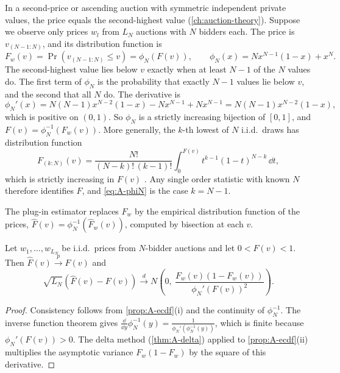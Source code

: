 In a second-price or ascending auction with symmetric independent private values, the price equals
the second-highest value (\cref{ch:auction-theory}). Suppose we observe only prices $w_l$ from $L_N$
auctions with $N$ bidders each. The price is $v_{(N-1:N)}$, and its distribution function is
\begin{equation}\label{eq:A-phiN}
F_w(v)=\Pr\left(v_{(N-1:N)}\le v\right)=\phi_N(F(v)),\qquad \phi_N(x)=Nx^{N-1}(1-x)+x^N .
\end{equation}
The second-highest value lies below $v$ exactly when at least $N-1$ of the $N$ values do. The first term
of $\phi_N$ is the probability that exactly $N-1$ values lie below $v$, and the second that all $N$ do.
The derivative is
\begin{equation*}
\phi_N'(x)=N(N-1)x^{N-2}(1-x)-Nx^{N-1}+Nx^{N-1}=N(N-1)x^{N-2}(1-x),
\end{equation*}
which is positive on $(0,1)$. So $\phi_N$ is a strictly increasing bijection of $[0,1]$, and
$F(v)=\phi_N^{-1}(F_w(v))$. More generally, the $k$-th lowest of $N$ i.i.d.\ draws has distribution
function
\begin{equation}\label{eq:A-orderstat}
F_{(k:N)}(v)=\frac{N!}{(N-k)!\,(k-1)!}\int_0^{F(v)}t^{k-1}(1-t)^{N-k}\,\dd t ,
\end{equation}
which is strictly increasing in $F(v)$ \citep[eq.~(5)]{AtheyHaile2002}. Any single order statistic with
known $N$ therefore identifies $F$, and \eqref{eq:A-phiN} is the case $k=N-1$.

The plug-in estimator replaces $F_w$ by the empirical distribution function of the prices,
$\hat F(v)=\phi_N^{-1}(\hat F_w(v))$, computed by bisection at each $v$.

\begin{proposition}\label{prop:A-os-inversion}
Let $w_1,\dots,w_{L_N}$ be i.i.d.\ prices from $N$-bidder auctions and let $0<F(v)<1$. Then
$\hat F(v)\xrightarrow{p}F(v)$ and
\begin{equation}\label{eq:A-os-avar}
\sqrt{L_N}\left(\hat F(v)-F(v)\right)\xrightarrow{d}
N\!\left(0,\ \frac{F_w(v)(1-F_w(v))}{\phi_N'(F(v))^2}\right).
\end{equation}
\end{proposition}

\begin{proof}
Consistency follows from \cref{prop:A-ecdf}(i) and the continuity of $\phi_N^{-1}$. The inverse
function theorem gives $\frac{\dd}{\dd y}\phi_N^{-1}(y)=\frac{1}{\phi_N'(\phi_N^{-1}(y))}$, which is
finite because $\phi_N'(F(v))>0$. The delta method (\cref{thm:A-delta}) applied to
\cref{prop:A-ecdf}(ii) multiplies the asymptotic variance $F_w(1-F_w)$ by the square of this
derivative.
\end{proof}


